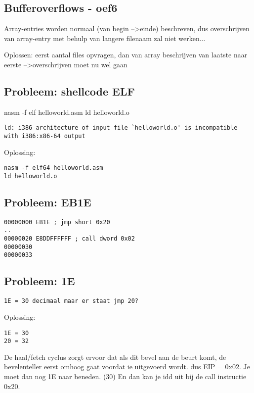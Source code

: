 \subsection{Bufferoverflows - oef6}
Array-entries worden normaal (van begin --\textgreater einde) beschreven, dus overschrijven van array-entry met behulp van langere filenaam zal niet werken...

Oplossen: eerst aantal files opvragen, dan van array beschrijven van laatste naar eerste --\textgreater overschrijven moet nu wel gaan

\subsection{Probleem: shellcode ELF}

nasm -f elf helloworld.asm ld helloworld.o
\begin{lstlisting}
ld: i386 architecture of input file `helloworld.o' is incompatible with i386:x86-64 output
\end{lstlisting}

Oplossing:
\begin{lstlisting}
nasm -f elf64 helloworld.asm
ld helloworld.o
\end{lstlisting}
    

\subsection{Probleem: EB1E}
\begin{lstlisting}
00000000 EB1E ; jmp short 0x20
..
00000020 E8DDFFFFFF ; call dword 0x02
00000030
00000033
\end{lstlisting}
    

\subsection{Probleem: 1E}
\begin{lstlisting}
1E = 30 decimaal maar er staat jmp 20?
\end{lstlisting}
    
Oplossing:
\begin{lstlisting}
1E = 30
20 = 32
\end{lstlisting}
De haal/fetch cyclus zorgt ervoor dat als dit bevel aan de beurt komt, de bevelenteller eerst omhoog gaat voordat ie uitgevoerd wordt. dus EIP = 0x02. Je moet dan nog 1E naar beneden. (30) En dan kan je idd uit bij de call instructie 0x20.